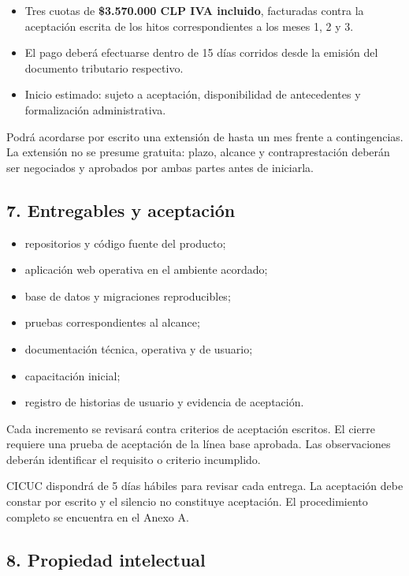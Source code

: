 \documentclass[
]{article}
\providecommand{\tightlist}{%
  \setlength{\itemsep}{0pt}\setlength{\parskip}{0pt}}
\begin{document}
\begin{itemize}
\tightlist
\item
  Tres cuotas de \textbf{\$3.570.000 CLP IVA incluido}, facturadas
  contra la aceptación escrita de los hitos correspondientes a los meses
  1, 2 y 3.
\item
  El pago deberá efectuarse dentro de 15 días corridos desde la emisión
  del documento tributario respectivo.
\item
  Inicio estimado: sujeto a aceptación, disponibilidad de antecedentes y
  formalización administrativa.
\end{itemize}

Podrá acordarse por escrito una extensión de hasta un mes frente a
contingencias. La extensión no se presume gratuita: plazo, alcance y
contraprestación deberán ser negociados y aprobados por ambas partes
antes de iniciarla.

\hypertarget{7-entregables-y-aceptaciuxf3n}{%
\subsection{7. Entregables y
aceptación}\label{7-entregables-y-aceptaciuxf3n}}

\begin{itemize}
\tightlist
\item
  repositorios y código fuente del producto;
\item
  aplicación web operativa en el ambiente acordado;
\item
  base de datos y migraciones reproducibles;
\item
  pruebas correspondientes al alcance;
\item
  documentación técnica, operativa y de usuario;
\item
  capacitación inicial;
\item
  registro de historias de usuario y evidencia de aceptación.
\end{itemize}

Cada incremento se revisará contra criterios de aceptación escritos. El
cierre requiere una prueba de aceptación de la línea base aprobada. Las
observaciones deberán identificar el requisito o criterio incumplido.

CICUC dispondrá de 5 días hábiles para revisar cada entrega. La
aceptación debe constar por escrito y el silencio no constituye
aceptación. El procedimiento completo se encuentra en el Anexo A.

\hypertarget{8-propiedad-intelectual}{%
\subsection{8. Propiedad intelectual}\label{8-propiedad-intelectual}}
\end{document}
